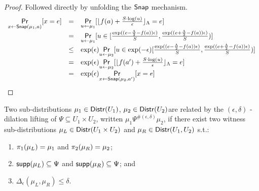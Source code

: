\documentclass{article}
\begin{document}
\begin{proof}
Followed directly by unfolding the $\mathsf{Snap}$ mechanism.
\[
	\begin{array}{lll}
	\underset{x \leftarrow \mathsf{Snap}(\mu_1, a)}{\mathsf{Pr}}[x = e] 
	& = & \underset{u \leftarrow \mu_1}{\mathsf{Pr}}[	\lfloor 
				f(a) + \frac{ S \cdot \log(u)}{\epsilon} 
				\rfloor_{\Lambda} = e
			]\\
	& = & \underset{ u \leftarrow \mu_1}{\mathsf{Pr}}[ u \in [
		   		\frac{\exp((e - \frac{\Lambda}{2} - f(a)) \epsilon )}{S},
		   		\frac{\exp((e + \frac{\Lambda}{2} - f(a)) \epsilon )}{S})
		   	]\\
	& \leq & \exp(\epsilon)
			\underset{ u \leftarrow \mu_2}{\mathsf{Pr}}[ u \in \exp(-\epsilon)[
		   		\frac{\exp((e - \frac{\Lambda}{2} - f(a)) \epsilon )}{S},
		   		\frac{\exp((e + \frac{\Lambda}{2} - f(a)) \epsilon )}{S})
		   	]\\
	& = & \exp(\epsilon)
			\underset{u \leftarrow \mu_2}{\mathsf{Pr}}[	\lfloor 
				f(a') + \frac{ S \cdot \log(u)}{\epsilon} 
				\rfloor_{\Lambda} = e
			]\\
	& = & \exp(\epsilon)
			\underset{x \leftarrow \mathsf{Snap}(\mu_2, a')}{\mathsf{Pr}}[x = e] 
	\end{array}
\]
\end{proof}


\begin{defn}
Two sub-distributions $\mu_1 \in \mathsf{Distr}(U_1)$, $\mu_2 \in \mathsf{Distr}(U_2)$are related by the $(\epsilon, \delta)$ - dilation lifting of $\Psi \subseteq U_1 \times U_2$, written $\mu_1 \Psi^{\#(\epsilon, \delta)} \mu_2$, if there exist two witness sub-distributions $\mu_L \in \mathsf{Distr}(U_1 \times U_2)$ and $\mu_R \in \mathsf{Distr}(U_1, U_2)$ s.t.:
\begin{enumerate}
	\item $\pi_1(\mu_L) = \mu_1$ and $\pi_2(\mu_R) = \mu_2$;
	\item $\mathsf{supp}(\mu_L) \subseteq \Psi$ and $\mathsf{supp}(\mu_R) \subseteq \Psi$; and
	\item $\Delta_{\epsilon}(\mu_L, \mu_R) \leq \delta$.
\end{enumerate}
\end{defn}
\end{document}
